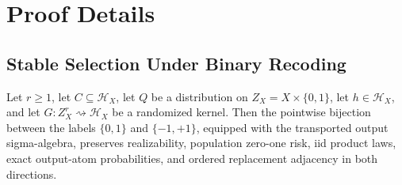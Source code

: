 \appendix

\section{Proof Details}\label{sec:proof-details}

\subsection{Stable Selection Under Binary Recoding}\label{app:stable-selection}

\begin{lemma}\label{lem:step-001-binary-recoding}
Let \(r\geq 1\), let \(C\subseteq\mathcal H_X\), let \(Q\) be a
distribution on \(Z_X=X\times\{0,1\}\), let \(h\in\mathcal H_X\), and
let \(G:Z_X^r\rightsquigarrow\mathcal H_X\) be a randomized kernel.
Then the pointwise bijection between the labels \(\{0,1\}\) and
\(\{-1,+1\}\), equipped with the transported output sigma-algebra,
preserves realizability, population zero-one risk, iid product laws,
exact output-atom probabilities, and ordered replacement adjacency in
both directions.
\end{lemma}

